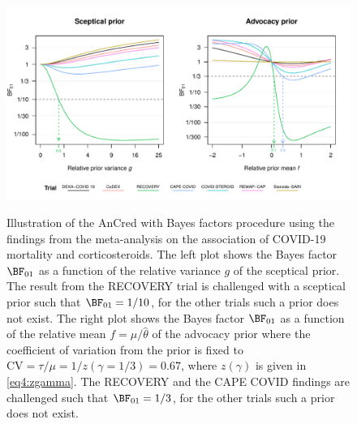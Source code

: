 \begin{figure}[!htb]
\begin{knitrout}
\color{fgcolor}
{\centering \includegraphics[width=\maxwidth]{images/paper4/AnCred-BF-examples-plot-1}
}
\end{knitrout}
\caption{Illustration of the AnCred with Bayes factors procedure using the
  findings from the meta-analysis on the association of COVID-19 mortality and
  corticosteroids. The left plot shows the Bayes factor $\BF_{01}$ as a function
  of the relative variance $g$ of the sceptical prior. The result from the
  RECOVERY trial is challenged with a sceptical prior such that
  $\BF_{01} = 1/10$, for the other trials such a prior does not exist. The right
  plot shows the Bayes factor $\BF_{01}$ as a function of the relative mean
  $f = \mu/\hat{\theta}$ of the advocacy prior where the coefficient of
  variation from the prior is fixed to
  \mbox{$\text{CV} = \tau/\mu = 1/z(\gamma=1/3) = 0.67$}, where $z(\gamma)$ is
  given in \eqref{eq4:zgamma}. The RECOVERY and the CAPE COVID findings are
  challenged such that $\BF_{01} = 1/3$, for the other trials such a prior does
  not exist.}
\label{fig4:bf}
\end{figure}

